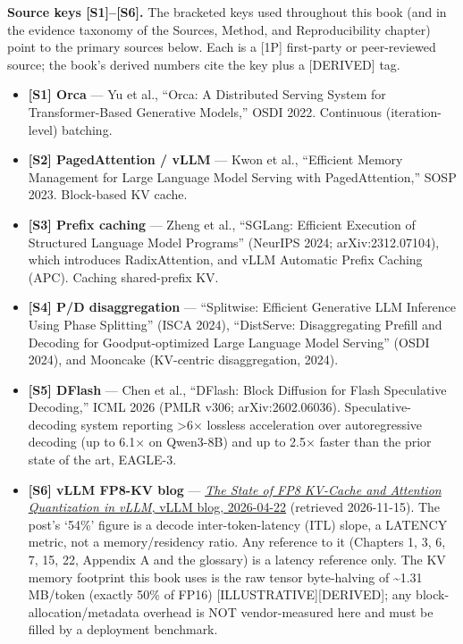 \textbf{Source keys \mbox{{[}S1{]}}--\mbox{{[}S6{]}}.} The bracketed keys used
throughout this book (and in the evidence taxonomy of the Sources,
Method, and Reproducibility chapter) point to the primary sources below.
Each is a \mbox{{[}1P{]}} first-party or peer-reviewed source; the book's
derived numbers cite the key plus a \mbox{{[}DERIVED{]}} tag.

\begin{itemize}
\tightlist
\item
  \textbf{\mbox{{[}S1{]}} Orca} --- Yu et al., ``Orca: A Distributed Serving
  System for Transformer-Based Generative Models,'' OSDI 2022.
  Continuous (iteration-level) batching.
\item
  \textbf{\mbox{{[}S2{]}} PagedAttention / vLLM} --- Kwon et al., ``Efficient
  Memory Management for Large Language Model Serving with
  PagedAttention,'' SOSP 2023. Block-based KV cache.
\item
  \textbf{\mbox{{[}S3{]}} Prefix caching} --- Zheng et al., ``SGLang: Efficient
  Execution of Structured Language Model Programs'' (NeurIPS 2024;
  arXiv:2312.07104), which introduces RadixAttention, and vLLM Automatic
  Prefix Caching (APC). Caching shared-prefix KV.
\item
  \textbf{\mbox{{[}S4{]}} P/D disaggregation} --- ``Splitwise: Efficient
  Generative LLM Inference Using Phase Splitting'' (ISCA 2024),
  ``DistServe: Disaggregating Prefill and Decoding for Goodput-optimized
  Large Language Model Serving'' (OSDI 2024), and Mooncake (KV-centric
  disaggregation, 2024).
\item
  \textbf{\mbox{{[}S5{]}} DFlash} --- Chen et al., ``DFlash: Block Diffusion
  for Flash Speculative Decoding,'' ICML 2026 (PMLR v306;
  arXiv:2602.06036). Speculative-decoding system reporting
  \textgreater6× lossless acceleration over autoregressive decoding (up
  to 6.1× on Qwen3-8B) and up to 2.5× faster than the prior state of the
  art, EAGLE-3.
\item
  \textbf{\mbox{{[}S6{]}} vLLM FP8-KV blog} ---
  \href{https://vllm.ai/blog/2026-04-22-fp8-kvcache}{\emph{The State of
  FP8 KV-Cache and Attention Quantization in vLLM}, vLLM blog,
  2026-04-22} (retrieved 2026-11-15). The post's `54\%' figure is a
  decode inter-token-latency (ITL) slope, a LATENCY metric, not a
  memory/residency ratio. Any reference to it (Chapters 1, 3, 6, 7, 15,
  22, Appendix A and the glossary) is a latency reference only. The KV
  memory footprint this book uses is the raw tensor byte-halving of
  \textasciitilde1.31 MB/token (exactly 50\% of FP16)
  \mbox{{[}ILLUSTRATIVE{]}}\hspace{0pt}\mbox{{[}DERIVED{]}}; any block-allocation/metadata
  overhead is NOT vendor-measured here and must be filled by a
  deployment benchmark.
\end{itemize}

